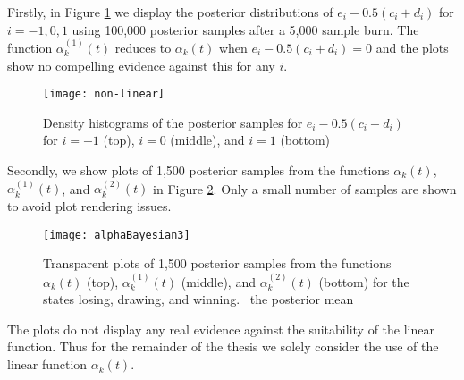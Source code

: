 Firstly, in Figure \ref{non-linear} we display the posterior distributions of \(e_i - 0.5(c_i + d_i)\) for \(i = -1,
0, 1\) using 100,000 posterior samples after a 5,000 sample burn. The function \(\alpha^{(1)}_k(t)\) reduces
to \(\alpha_k(t)\) when \(e_i - 0.5(c_i + d_i) = 0\) and the plots show no compelling evidence against this for any
\(i\). 
\begin{figure}[htp]
\begin{center}
\texttt{[image: non-linear]}
\caption{Density histograms of the posterior samples for \(e_i - 0.5(c_i + d_i)\) for \(i = -1\) (top), \(i = 0\)
(middle), and \(i = 1\) (bottom)}
\label{non-linear}
\end{center}
\end{figure}
Secondly, we show plots of 1,500 posterior samples from the functions \(\alpha_k(t)\), \(\alpha^{(1)}_k(t)\), and
\(\alpha^{(2)}_k(t)\) in Figure \ref{alphaBayesian}. Only a small number of samples are shown to avoid plot rendering
issues.
\begin{figure}[htp]
\begin{center}
\texttt{[image: alphaBayesian3]}
\caption{Transparent plots of 1,500 posterior samples from the functions \(\alpha_k(t)\) (top), \(\alpha^{(1)}_k(t)\)
(middle), and \(\alpha^{(2)}_k(t)\) (bottom) for the states losing, drawing, and winning. \protect\redSolidLine\ the
posterior mean}
\label{alphaBayesian}
\end{center}
\end{figure}
The plots do not display any real evidence against the suitability of the linear function. Thus for the remainder of the
thesis we solely consider the use of the linear function \(\alpha_k(t)\).

